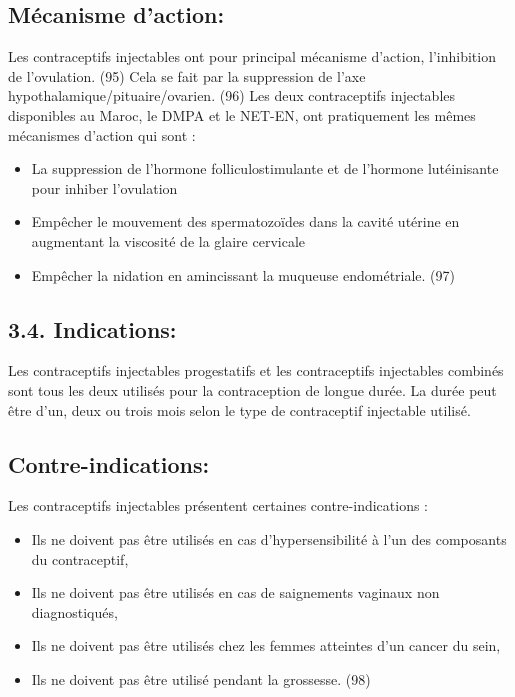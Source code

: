 \subsection{Mécanisme d’action: }

Les contraceptifs injectables ont pour principal mécanisme d’action, l’inhibition de l’ovulation. (95) Cela se fait par la suppression de l’axe hypothalamique/pituaire/ovarien. (96) Les deux contraceptifs injectables disponibles au Maroc, le DMPA et le NET-EN, ont pratiquement les mêmes mécanismes d’action qui sont :  

\begin{itemize}
  \item La suppression de l’hormone folliculostimulante et de l’hormone lutéinisante pour inhiber l’ovulation 
  \item Empêcher le mouvement des spermatozoïdes dans la cavité utérine en augmentant la viscosité de la glaire cervicale
  \item Empêcher la nidation en amincissant la muqueuse endométriale. (97) 
\end{itemize}

\subsection{3.4. Indications:}

Les contraceptifs injectables progestatifs et les contraceptifs injectables combinés sont tous les deux utilisés pour la contraception de longue durée. La durée peut être d’un, deux ou trois mois selon le type de contraceptif injectable utilisé. 

\subsection{Contre-indications:}

Les contraceptifs injectables présentent certaines contre-indications : 

\begin{itemize}
  \item  Ils ne doivent pas être utilisés en cas d’hypersensibilité à l’un des composants du contraceptif,
  \item Ils ne doivent pas être utilisés en cas de saignements vaginaux non diagnostiqués, 
  \item Ils ne doivent pas être utilisés chez les femmes atteintes d’un cancer du sein,
  \item Ils ne doivent pas être utilisé pendant la grossesse. (98)
\end{itemize}

